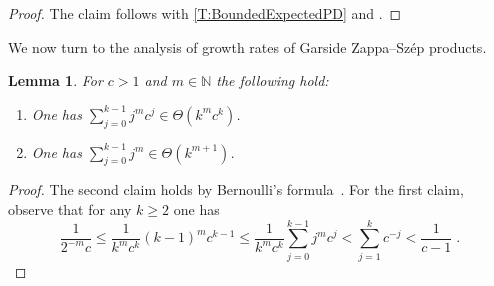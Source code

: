\documentclass[a4paper,final]{article}
\let\le\leqslant
\let\ge\geqslant
\theoremstyle{plain}
\newtheorem{lemma}[lemma]{Lemma}
\theoremstyle{remark}
\theoremstyle{definition}
\begin{document}
\begin{proof}
The claim follows with \autoref{T:BoundedExpectedPD} and \cite[Theorem 4.7]{GT13}.
\end{proof}

\smallskip\noindent
We now turn to the analysis of growth rates of Garside {Zappa--Sz{\'e}p}{} products.

\begin{lemma}\label{L:Sums}
For $c>1$ and $m\in{\mathbb{N}}$ the following hold:
\begin{enumerate} \itemsep 0em \vspace{-0.5\topskip}
\item One has $\sum_{j=0}^{k-1} j^m c^j \in \Theta(k^m c^k)$.
\item One has $\sum_{j=0}^{k-1} j^m \in \Theta(k^{m+1})$.
\end{enumerate}
\end{lemma}

\begin{proof}
The second claim holds by Bernoulli's formula~\cite[p.\,283]{concrete}.  For the first claim, observe that for any $k\ge2$ one has
\[
\frac1{2^{-m}c}
 \le \frac{1}{k^m c^k} (k-1)^m c^{k-1}
 \le \frac{1}{k^m c^k} \sum_{j=0}^{k-1} j^m c^j
 <   \sum_{j=1}^k c^{-j}
 <   \frac{1}{c-1}  \;.
\]
\end{proof}
\end{document}
